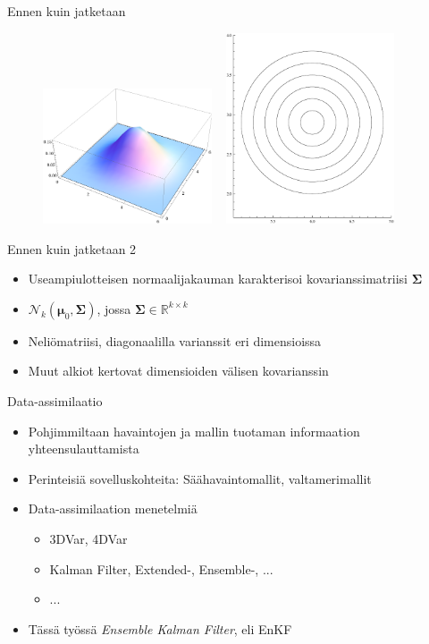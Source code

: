 \documentclass{beamer}
\begin{document}
\begin{frame}{Ennen kuin jatketaan}

\begin{figure}
\includegraphics[width=5cm]{2dnormal.pdf}
$~~$
\includegraphics[width=5cm]{2dcontour.pdf}
\end{figure}

\end{frame}

\begin{frame}{Ennen kuin jatketaan 2}

\begin{itemize}
\item Useampiulotteisen normaalijakauman karakterisoi kovarianssimatriisi $\boldsymbol{\Sigma}$
\item $\mathcal{N}_k(\boldsymbol{\mu}_0,\boldsymbol{\Sigma})$, jossa $\boldsymbol{\Sigma} \in \mathbb{R}^{k \times k}$
\item Neliömatriisi, diagonaalilla varianssit eri dimensioissa
\item Muut alkiot kertovat dimensioiden välisen kovarianssin
\end{itemize}

\end{frame}

\begin{frame}{Data-assimilaatio}

\begin{itemize}
\item Pohjimmiltaan havaintojen ja mallin tuotaman informaation yhteensulauttamista
\item Perinteisiä sovelluskohteita: Säähavaintomallit, valtamerimallit
\item Data-assimilaation menetelmiä
\begin{itemize}
\item 3DVar, 4DVar
\item Kalman Filter, Extended-, Ensemble-, ...
\item ...
\end{itemize}
\item Tässä työssä \emph{Ensemble Kalman Filter}, eli EnKF
\end{itemize}

\end{frame}
\end{document}
